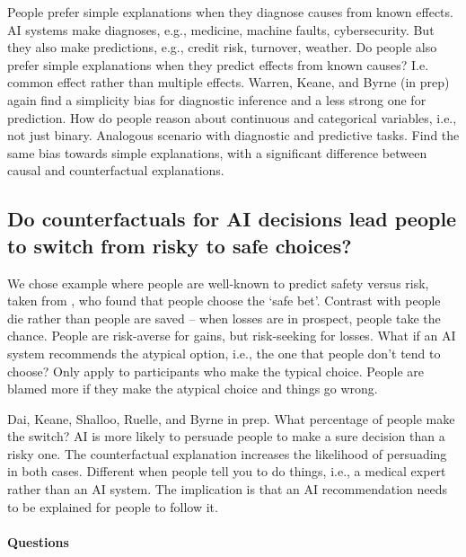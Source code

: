 People prefer simple explanations when they diagnose causes from known effects.
AI systems make diagnoses, e.g., medicine, machine faults, cybersecurity.
But they also make predictions, e.g., credit risk, turnover, weather.
Do people also prefer simple explanations when they predict effects from known causes?
I.e. common effect rather than multiple effects.
Warren, Keane, and Byrne (in prep) again find a simplicity bias for diagnostic
inference and a less strong one for prediction.
How do people reason about continuous and categorical variables, i.e., not just binary.
Analogous scenario with diagnostic and predictive tasks.
Find the same bias towards simple explanations, with a significant difference between
causal and counterfactual explanations.

\subsection*{Do counterfactuals for AI decisions lead people to switch from risky to
  safe choices?}

We chose example where people are well-known to predict safety versus risk, taken from
\textcites{Kahneman1982}, who found that people choose the `safe bet'.
Contrast with people die rather than people are saved -- when losses are in prospect,
people take the chance.
People are risk-averse for gains, but risk-seeking for losses.
What if an AI system recommends the atypical option, i.e., the one that people don't
tend to choose?
Only apply to participants who make the typical choice.
People are blamed more if they make the atypical choice and things go wrong.

Dai, Keane, Shalloo, Ruelle, and Byrne in prep.
What percentage of people make the switch?
AI is more likely to persuade people to make a sure decision than a risky one.
The counterfactual explanation increases the likelihood of persuading in both cases.
Different when people tell you to do things, i.e., a medical expert rather than an AI
system.
The implication is that an AI recommendation needs to be explained for people to follow
it.

\paragraph{Questions}

